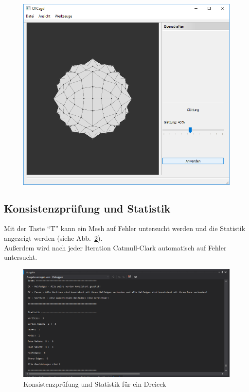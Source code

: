 \begin{figure}[H]
	\centering
	\includegraphics[scale=0.5]{content/pictures/10-Smoothing}
	\caption{}
	\label{fig:Smoothing}
\end{figure}

\subsection{Konsistenzprüfung und Statistik}
Mit der Taste "`T"' kann ein Mesh auf Fehler untersucht werden und die Statistik angezeigt werden (siehe Abb.~\ref{fig:TestStatistik}).\\
Au\ss{}erdem wird nach jeder Iteration Catmull-Clark automatisch auf Fehler untersucht.

\begin{figure}[H]
	\centering
	\includegraphics[scale=0.5]{content/pictures/11-TestStatistik}
	\caption{Konsistenzprüfung und Statistik für ein Dreieck}
	\label{fig:TestStatistik}
\end{figure}
